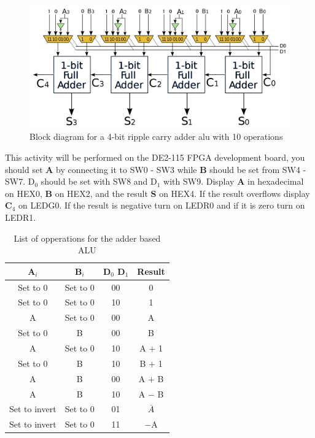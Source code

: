 \begin{figure}[H]
	\centering
	\includegraphics[width=150mm]{Lab3/figures/fulladderalu.png}
	\caption{Block diagram for a 4-bit ripple carry adder alu with 10 operations}
	\label{fig:fulladderalu}
\end{figure}

This activity will be performed on the DE2-115 FPGA development board, you should set {\bf A} by connecting it to SW0 - SW3 while {\bf B} should be set from SW4 - SW7. D$_0$ should be set with SW8 and D$_1$ with SW9. Display {\bf A} in hexadecimal on HEX0, {\bf B} on HEX2, and the result {\bf S} on HEX4. If the result overflows display {\bf C$_4$} on LEDG0. If the result is negative turn on LEDR0 and if it is zero turn on LEDR1.

\begin{table}[H]
	\centering
	\caption{List of opperations for the adder based ALU}
	\begin{tabular}{ | c | c | c | c | }
		\hline                        
 		\bf A$_i$ & \bf B$_i$ & \bf D$_0$ D$_1$ & \bf Result \\ \hline
 		Set to 0 & Set to 0 & 00 & 0 \\ \hline
 		Set to 0 &  Set to 0 &10 & 1 \\ \hline
 		A &  Set to 0 & 00 & A \\ \hline
 		Set to 0& B  & 00  & B  \\ \hline
 		A & Set to 0 & 10 & A $+$ 1 \\ \hline
 		Set to 0 & B & 10 & B $+$ 1 \\ \hline
 		A & B & 00 & A $+$ B \\ \hline
 		A & B & 10 & A $-$ B \\ \hline
 		Set to invert & Set to 0 & 01 & $\overline{A}$ \\ \hline
 		Set to invert & Set to 0 & 11 & $-$A \\ 
 		\hline
	\end{tabular}
	\label{tab:adderaluop}
\end{table}

